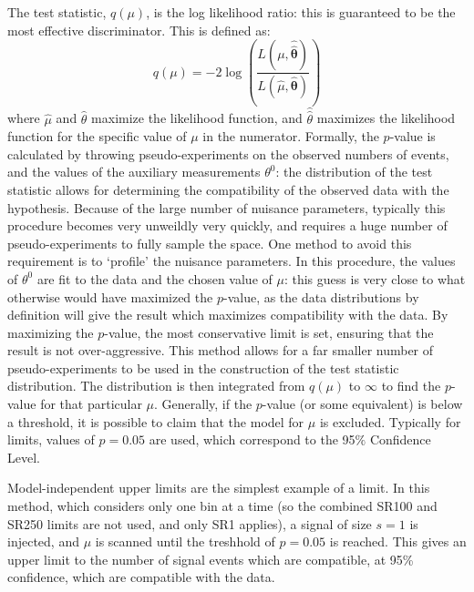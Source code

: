 The test statistic, $q(\mu)$, is the log likelihood ratio: this is guaranteed to be the most effective discriminator. This is defined as:
%
\begin{equation}
q(\mu) = -2 \log \left( \frac{L(\mu, \boldsymbol{\hat{\hat{\theta}}})}{L(\hat{\mu},\boldsymbol{\hat{\theta}})}\right)
\end{equation}
% 
where $\hat{\mu}$ and $\hat{\theta}$ maximize the likelihood function, and $\hat{\hat{\theta}}$ maximizes the likelihood function for the specific value of $\mu$ in the numerator. Formally, the $p$-value is calculated by throwing pseudo-experiments on the observed numbers of events, and the values of the auxiliary measurements $\theta^0$: the distribution of the test statistic allows for determining the compatibility of the observed data with the hypothesis.  Because of the large number of nuisance parameters, typically this procedure becomes very unweildly very quickly, and requires a huge number of pseudo-experiments to fully sample the space. One method to avoid this requirement is to `profile' the nuisance parameters. In this procedure, the values of $\theta^0$ are fit to the data and the chosen value of $\mu$: this guess is very close to what otherwise would have maximized the $p$-value, as the data distributions by definition will give the result which maximizes compatibility with the data. By maximizing the $p$-value, the most conservative limit is set, ensuring that the result is not over-aggressive. This method allows for a far smaller number of pseudo-experiments to be used in the construction of the test statistic distribution. The distribution is then integrated from $q(\mu)$ to $\infty$ to find the $p$-value for that particular $\mu$. Generally, if the $p$-value (or some equivalent) is below a threshold, it is possible to claim that the model for $\mu$ is excluded. Typically for limits, values of $p=0.05$ are used, which correspond to the 95$\%$ Confidence Level. 


Model-independent upper limits are the simplest example of a limit. In this method, which considers only one bin at a time (so the combined SR100 and SR250 limits are not used, and only SR1 applies),  a signal of size $s=1$ is injected, and $\mu$ is scanned until the treshhold of $p=0.05$ is reached. This gives an upper limit to the number of signal events which are compatible, at 95\% confidence, which are compatible with the data.

